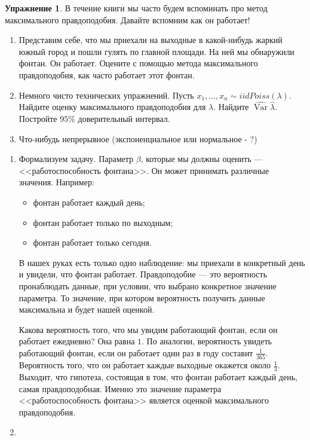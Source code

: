 \documentclass[12pt, a4paper, oneside]{extreport}
\DeclareMathOperator{\Var}{Var}
\theoremstyle{plain}              %
\theoremstyle{definition}         %
\newtheorem{problem}{\color{myblue} Упражнение}
\begin{document}
\begin{problem} 
В течение книги мы часто будем вспоминать про метод максимального правдоподобия. Давайте вспомним как он работает! 

\begin{enumerate}
	\item Представим себе, что мы приехали на выходные в какой-нибудь жаркий южный город и пошли гулять по главной площади. На ней мы обнаружили фонтан. Он работает. Оцените с помощью метода максимального правдоподобия, как часто работает этот фонтан. 
	
	\item 	Немного чисто технических упражнений. Пусть $x_1, \ldots, x_n  \sim  iid  Poiss(\lambda)$. Найдите оценку максимального правдоподобия для $\lambda$.  Найдите $\hat{\Var}{\hat \lambda}$. Постройте $95\%$ доверительный интервал. 

	\item  Что-нибудь непрерывное  (экспоненциальное или нормальное - ?)

\end{enumerate}
\end{problem}

\begin{sol}
	\begin{enumerate}	
	\item Формализуем задачу. Параметр $\beta$, которые мы должны оценить --- <<работоспособность фонтана>>. Он может принимать различные значения. Например:
	
	\begin{itemize}
		\item фонтан работает каждый день;
		\item фонтан работает только по выходным;
		\item фонтан работает только сегодня.
	\end{itemize}

	В нашех руках есть только одно наблюдение: мы приехали в конкретный день и увидели, что фонтан работает. Правдоподобие --- это вероятность пронаблюдать данные, при условии, что выбрано конкретное значение параметра. То значение, при котором вероятность получить данные максимальна и будет нашей оценкой. 
	
	 Какова вероятность того, что мы увидим работающий фонтан, если он работает ежедневно?  Она равна $1$. По аналогии, вероятность увидеть работающий фонтан, если он работает один раз в году составит $\frac{1}{365}$. Вероятность того, что он работает каждые выходные окажется около $\frac{1}{3}$.  Выходит, что гипотеза, состоящая в том, что фонтан работает каждый день, самая правдоподобная. Именно это значение параметра <<работоспособность фонтана>> является оценкой максимального правдоподобия. 
		
	\item 
		
	\end{enumerate}	
\end{sol}
\end{document}
